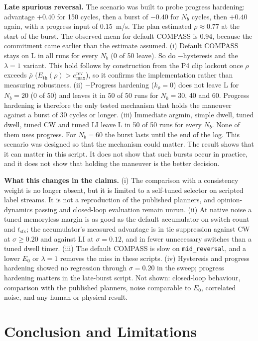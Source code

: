 \documentclass[11pt]{article}
\newcommand{\Eremax}{e^{\text{rev}}_{\max}}
\newcommand{\Eth}{E_{\text{th}}}
\newcommand{\code}[1]{\texttt{#1}}
\begin{document}
\noindent\textbf{Late spurious reversal.} The scenario was built to probe progress hardening: advantage $+0.40$ for 150 cycles, then a burst of $-0.40$ for $N_b$ cycles, then $+0.40$ again, with a progress input of $0.15$~m/s. The plan estimated $\rho\approx0.77$ at the start of the burst. The observed mean for default COMPASS is 0.94, because the commitment came earlier than the estimate assumed. (i) Default COMPASS stays on L in all runs for every $N_b$ (0 of 50 leave). So do $-$hysteresis and the $\lambda=1$ variant. This hold follows by construction from the P4 clip lockout once $\rho$ exceeds $\bar\rho$ ($\Eth(\rho)>\Eremax$), so it confirms the implementation rather than measuring robustness. (ii) $-$Progress hardening ($k_\rho=0$) does not leave L for $N_b=20$ (0 of 50) and leaves it in 50 of 50 runs for $N_b=30$, 40 and 60. Progress hardening is therefore the only tested mechanism that holds the maneuver against a burst of 30 cycles or longer. (iii) Immediate argmin, simple dwell, tuned dwell, tuned CW and tuned LI leave L in 50 of 50 runs for every $N_b$. None of them uses progress. For $N_b=60$ the burst lasts until the end of the log. This scenario was designed so that the mechanism could matter. The result shows that it can matter in this script. It does not show that such bursts occur in practice, and it does not show that holding the maneuver is the better decision.

\noindent\textbf{What this changes in the claims.} (i) The comparison with a consistency weight is no longer absent, but it is limited to a self-tuned selector on scripted label streams. It is not a reproduction of the published planners, and opinion-dynamics passing and closed-loop evaluation remain unrun. (ii) At native noise a tuned memoryless margin is as good as the default accumulator on switch count and $t_{\text{sfx}}$; the accumulator's measured advantage is in tie suppression against CW at $\sigma\ge0.20$ and against LI at $\sigma=0.12$, and in fewer unnecessary switches than a tuned dwell timer. (iii) The default COMPASS is slow on \code{mid\_reversal}, and a lower $E_0$ or $\lambda=1$ removes the miss in these scripts. (iv) Hysteresis and progress hardening showed no regression through $\sigma=0.20$ in the sweep; progress hardening matters in the late-burst script. Not shown: closed-loop behaviour, comparison with the published planners, noise comparable to $E_0$, correlated noise, and any human or physical result.

\FloatBarrier
\section{Conclusion and Limitations}
\end{document}
